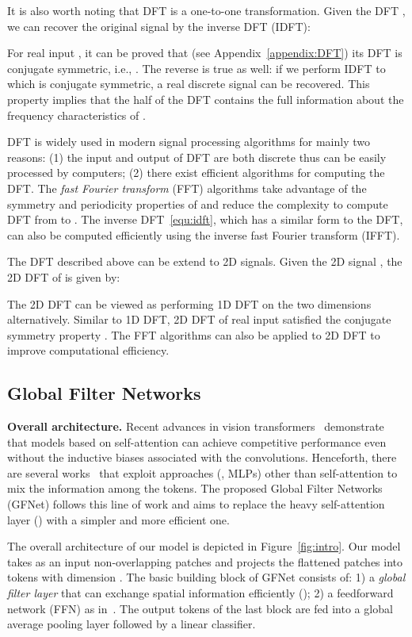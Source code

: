 \documentclass{article}
\numberwithin{equation}{section}
\newcommand{\gknet}{GFNet}
\newcommand{\paragrapha}[2][1pt]{\vspace{#1}\noindent\textbf{#2}}
\begin{document}
It is also worth noting that DFT is a one-to-one transformation. Given the DFT , we can recover the original signal  by the inverse DFT (IDFT):


For real input , it can be proved that (see Appendix~\ref{appendix:DFT}) its DFT is conjugate symmetric, i.e., . The reverse is true as well: if we perform IDFT to  which is conjugate symmetric, a real discrete signal can be recovered. This property implies that the half of the DFT  contains the full information about the frequency characteristics of .


DFT is widely used in modern signal processing algorithms for mainly two reasons: (1) the input and output of DFT are both discrete thus can be easily processed by computers; (2) there exist efficient algorithms for computing the DFT. The \emph{fast Fourier transform} (FFT) algorithms take advantage of the symmetry and periodicity properties of  and reduce the complexity to compute DFT from  to . The inverse DFT~\eqref{equ:idft}, which has a similar form to the DFT, can also be computed efficiently using the inverse fast Fourier transform (IFFT).

The DFT described above can be extend to 2D signals. Given the 2D signal , the 2D DFT of  is given by:

The 2D DFT can be viewed as performing 1D DFT on the two dimensions alternatively. Similar to 1D DFT, 2D DFT of real input  satisfied the conjugate symmetry property . The FFT algorithms can also be applied to 2D DFT to improve computational efficiency.


\subsection{Global Filter Networks}\label{sec:gknet}
\paragrapha{Overall architecture.} Recent advances in vision transformers~\cite{dosovitskiy2020vit,touvron2020deit} demonstrate that models based on self-attention can achieve competitive performance even without the inductive biases associated with the convolutions. Henceforth, there are several works~\cite{touvron2021resmlp,tolstikhin2021mlp} that exploit approaches (\eg, MLPs) other than self-attention to mix the information among the tokens. The proposed Global Filter Networks (\gknet) follows this line of work and aims to replace the heavy self-attention layer () with a simpler and more efficient one. 

The overall architecture of our model is depicted in Figure~\ref{fig:intro}. Our model takes as an input  non-overlapping patches and projects the flattened patches into  tokens with dimension . The basic building block of \gknet{} consists of: 1) a \emph{global filter layer} that can exchange spatial information efficiently (); 2) a feedforward network (FFN) as in~\cite{dosovitskiy2020vit,touvron2020deit}. The output tokens of the last block are fed into a global average pooling layer followed by a linear classifier.
\end{document}
